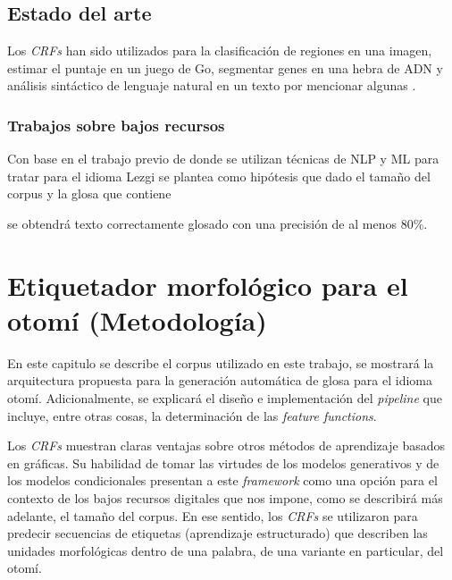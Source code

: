 \documentclass[letterpaper,12pt,oneside]{book}
\theoremstyle{definition}
\begin{document}
	
	\section{Estado del arte}

	
	Los \textit{CRFs} han sido utilizados para la clasificación de regiones en una imagen, estimar el puntaje en un juego de Go, segmentar genes en una hebra de ADN y análisis sintáctico de lenguaje natural en un texto por mencionar algunas \citep{sutton2012introduction}.

	
	
	\subsection{Trabajos sobre bajos recursos}


	Con base en el trabajo previo de \citep{moeller2018automatic} donde se utilizan técnicas de NLP y ML para tratar para el idioma Lezgi se plantea como hipótesis que dado el tamaño del corpus y la glosa que contiene 

	se obtendrá texto correctamente glosado con una precisión de al menos 80\%.

	

	


	
	
	\chapter{Etiquetador morfológico para el otomí (Metodología)}

	
	En este capitulo se describe el corpus utilizado en este trabajo, se mostrará la arquitectura propuesta para la generación automática de glosa para el idioma otomí. Adicionalmente, se explicará el diseño e implementación del \textit{pipeline} que incluye, entre otras cosas, la determinación de las \textit{feature functions}.

	

	Los \textit{CRFs} muestran claras ventajas sobre otros métodos de aprendizaje basados en gráficas. Su habilidad de tomar las virtudes de los modelos generativos y de los modelos condicionales presentan a este \textit{framework} como una opción para el contexto de los bajos recursos digitales que nos impone, como se describirá más adelante, el tamaño del corpus. En ese sentido, los \textit{CRFs} se utilizaron para predecir secuencias de etiquetas (aprendizaje estructurado) que describen las unidades morfológicas dentro de una palabra, de una variante en particular, del otomí. 
\end{document}
